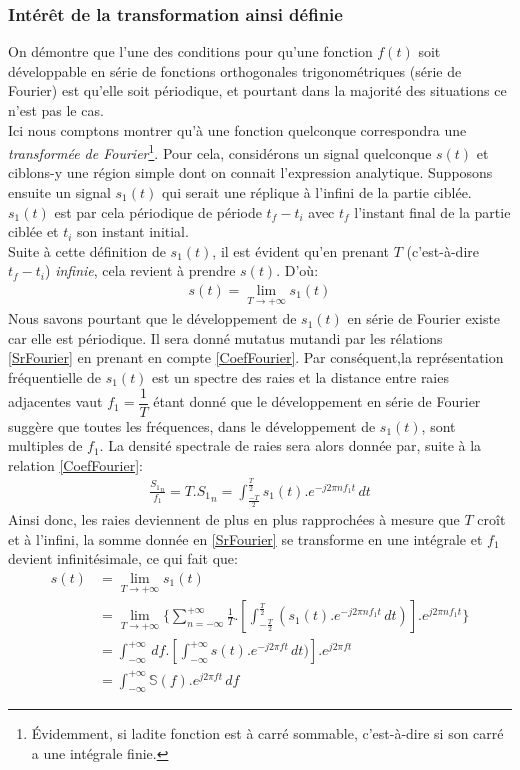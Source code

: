 \subsubsection{Intérêt de la transformation ainsi définie}\label{InteretFourier}
On démontre que l'une des conditions pour qu'une fonction $ f(t) $ soit développable en série de fonctions orthogonales trigonométriques (série de Fourier) est qu'elle soit périodique, et pourtant dans la majorité des situations ce n'est pas le cas.\\
Ici nous comptons montrer qu'à une fonction quelconque correspondra une \emph{transformée de Fourier}\footnote{Évidemment, si ladite fonction est à carré sommable, c'est-à-dire si son carré a une intégrale finie.}. Pour cela, considérons un signal quelconque $ s(t) $ et ciblons-y une région simple dont on connait l'expression analytique. Supposons ensuite un signal $ s_{1}(t) $ qui serait une réplique à l'infini de la partie ciblée. $ s_{1}(t) $ est par cela périodique de période $ t_{f}-t_{i} $ avec $ t_{f} $ l'instant final de la partie ciblée et $ t_{i} $ son instant initial.\\
Suite à cette définition de $ s_{1}(t) $, il est évident qu'en prenant $ T $ (c'est-à-dire $ t_{f}-t_{i} $) \emph{infinie}, cela revient à prendre $ s(t) $. D'où:
\begin{eqnarray}
s(t) = \lim_{T \to +\infty} s_{1}(t)
\end{eqnarray}
Nous savons pourtant que le développement de $ s_{1}(t) $ en série de Fourier existe car elle est périodique. Il sera donné mutatus mutandi par les rélations \ref{SrFourier} en prenant en compte \ref{CoefFourier}. Par conséquent,la représentation fréquentielle de $ s_{1}(t) $ est un spectre des raies et la distance entre raies adjacentes vaut $ f_{1} = \dfrac{1}{T} $ étant donné que le développement en série de Fourier suggère que toutes les fréquences, dans le développement de $ s_{1}(t) $, sont multiples de $ f_{1} $. La densité spectrale de raies sera alors donnée par, suite à la relation \ref{CoefFourier}:
\begin{eqnarray}\label{DensiteSpectrale}
\frac{{S_{1}}_{n}}{f_{1}} = T.{S_{1}}_{n} = \int_{\frac{-T}{2}}^{\frac{T}{2}}s_{1}(t).e^{-j2{\pi}nf_{1}t}\,dt
\end{eqnarray}
Ainsi donc, les raies deviennent de plus en plus rapprochées à mesure que $ T $ croît et à l'infini, la somme donnée en \ref{SrFourier} se transforme en une intégrale et $ f_{1} $ devient infinitésimale, ce qui fait que:
\begin{align*}
s(t) &= \lim_{T \to +\infty} s_{1}(t)\\
&= \lim_{T \to +\infty} \{\sum_{n = -\infty}^{+\infty}\frac{1}{T}.[\int_{-\frac{T}{2}}^{\frac{T}{2}}(s_{1}(t).e^{-j2{\pi}nf_{1}t}\,dt)].e^{j2{\pi}nf_{1}t}\}\\
&= \int_{-\infty}^{+\infty}\,df.[\int_{-\infty}^{+\infty}s(t).e^{-j2{\pi}ft}\,dt)].e^{j2{\pi}ft}\\
&= \int_{-\infty}^{+\infty}\mathbb{S}(f).e^{j2{\pi}ft}\,df
\end{align*}
